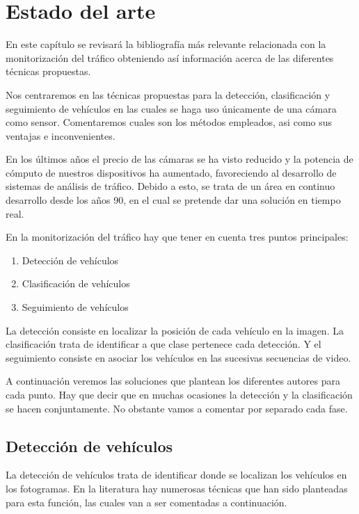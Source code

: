 \chapter{Estado del arte}\label{cap.estado}

En este capítulo se revisará la bibliografía más relevante relacionada con la monitorización del tráfico obteniendo así información acerca de las diferentes técnicas propuestas. 

Nos centraremos en las técnicas propuestas para la detección, clasificación y seguimiento de vehículos en las cuales se haga uso únicamente de una cámara como sensor. Comentaremos cuales son los métodos empleados, asi como sus ventajas e inconvenientes.

En los últimos años el precio de las cámaras se ha visto reducido y la potencia de cómputo de nuestros dispositivos ha aumentado, favoreciendo al desarrollo de sistemas de análisis de tráfico. Debido a esto, se trata de un área en continuo desarrollo desde los años 90, en el cual se pretende dar una solución en tiempo real. 

En la monitorización del tráfico hay que tener en cuenta tres puntos principales:
\begin{enumerate}
    \item Detección de vehículos
    \item Clasificación de vehículos
    \item Seguimiento de vehículos
\end{enumerate}

La detección consiste en localizar la posición de cada vehículo en la imagen. La clasificación trata de identificar a que clase pertenece cada detección. Y el seguimiento consiste en asociar los vehículos en las sucesivas secuencias de video.

A continuación veremos las soluciones que plantean los diferentes autores para cada punto. Hay que decir que en muchas ocasiones la detección y la clasificación se hacen conjuntamente. No obstante vamos a comentar por separado cada fase.

\section{Detección de vehículos} \label{ap.deteccion_vehiculos}

La detección de vehículos trata de identificar donde se localizan los vehículos en los fotogramas. En la literatura hay numerosas técnicas que han sido planteadas para esta función, las cuales van a ser comentadas a continuación. 


